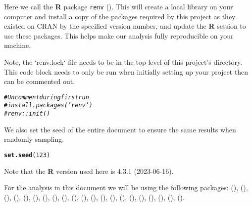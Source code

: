 \documentclass{article}\usepackage[]{graphicx}\usepackage[]{xcolor}
\makeatletter
\newcommand{\hlnum}[1]{\textcolor[rgb]{0.686,0.059,0.569}{#1}}%
\newcommand{\hlcom}[1]{\textcolor[rgb]{0.678,0.584,0.686}{\textit{#1}}}%
\newcommand{\hlstd}[1]{\textcolor[rgb]{0.345,0.345,0.345}{#1}}%
\newcommand{\hlkwd}[1]{\textcolor[rgb]{0.737,0.353,0.396}{\textbf{#1}}}%
\newenvironment{kframe}{%
 \def\at@end@of@kframe{}%
 \ifinner\ifhmode%
  \def\at@end@of@kframe{\end{minipage}}%
  \begin{minipage}{\columnwidth}%
 \fi\fi%
 \def\FrameCommand##1{\hskip\@totalleftmargin \hskip-\fboxsep
 \colorbox{shadecolor}{##1}\hskip-\fboxsep
     \hskip-\linewidth \hskip-\@totalleftmargin \hskip\columnwidth}%
 \MakeFramed {\advance\hsize-\width
   \@totalleftmargin\z@ \linewidth\hsize
   \@setminipage}}%
 {\par\unskip\endMakeFramed%
 \at@end@of@kframe}
\newenvironment{knitrout}{}{} %
\makeatother
\begin{document}
Here we call the  \textbf{R} package \texttt{renv} (\cite{R-renv}). This will create a local library on your computer and install a copy of the packages required by this project as they existed on CRAN by the specified version number, and update the \textbf{R} session to use these packages. This helps make our analysis fully reproducible on your machine. 

Note, the `renv.lock` file needs to be in the top level of this project's directory. This code block needs to only be run when initially setting up your project then can be commented out.

\begin{knitrout}
\color{fgcolor}\begin{kframe}
\begin{alltt}
\hlcom{# Uncomment during first run}
\hlcom{# install.packages('renv')}
\hlcom{# renv::init()}
\end{alltt}
\end{kframe}
\end{knitrout}

We also set the seed of the entire document to ensure the same results when randomly sampling.

\begin{knitrout}
\color{fgcolor}\begin{kframe}
\begin{alltt}
\hlkwd{set.seed}\hlstd{(}\hlnum{123}\hlstd{)}
\end{alltt}
\end{kframe}
\end{knitrout}


Note that the \textbf{R} version used here is 4.3.1 (2023-06-16).






 
For the analysis in this document we will be using the following packages:  (\cite{R-data.table}),  (\cite{R-foreach}),  (\cite{R-formatR}),  (\cite{R-ggthemes}),  (\cite{R-gmodels}),  (\cite{R-hablar}),  (\cite{R-leaflet}),  (\cite{R-lintr}),  (\cite{R-magrittr}),  (\cite{R-knitr}),  (\cite{R-kknn}),  (\cite{R-plyr}),  (\cite{R-raster}),  (\cite{R-renv}),  (\cite{R-reshape2}),  (\cite{R-rgdal}),  (\cite{R-rworldmap}),  (\cite{R-sf}),  (\cite{R-tidyverse}),  (\cite{R-viridis}),  (\cite{R-zoo}).
\end{document}
